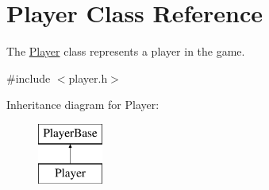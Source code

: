 \hypertarget{classPlayer}{\section{Player Class Reference}
\label{classPlayer}
}


The \hyperlink{classPlayer}{Player} class represents a player in the game.  




{\ttfamily \#include $<$player.\-h$>$}

Inheritance diagram for Player\-:\begin{figure}[H]
\begin{center}
\leavevmode
\includegraphics[height=2.000000cm]{classPlayer}
\end{center}
\end{figure}
